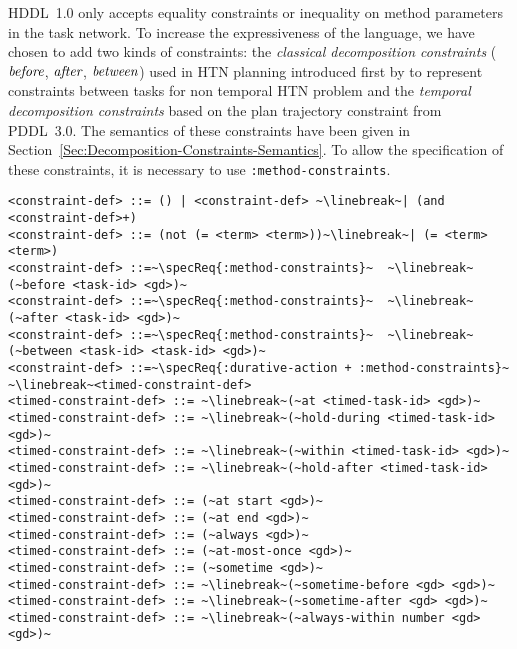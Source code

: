\documentclass[letterpaper]{article} %
\newcommand{\before}{\text{\it before}}
\newcommand{\after}{\text{\it after}}
\renewcommand{\between}{\text{\it between}}
\begin{document}
%
%
HDDL~1.0 only accepts equality constraints or inequality on method parameters in the task network. To increase the expressiveness of the language, we have chosen to add two kinds of constraints: the {\em classical decomposition constraints} ($\before$, $\after$, $\between$) used in HTN planning introduced first by \citep{erol94} to represent constraints between tasks for non temporal HTN problem and the {\em temporal decomposition constraints} based on the plan trajectory constraint from PDDL~3.0. The semantics of these constraints have been given in Section~\ref{Sec:Decomposition-Constraints-Semantics}. To allow the specification of these constraints, it is necessary to use \verb+:method-constraints+.

\begin{lstlisting}[firstnumber=last, basicstyle=\fontsize{8.5}{10}\selectfont\ttfamily, escapechar=~]
<constraint-def> ::= () | <constraint-def> ~\linebreak~| (and <constraint-def>+)
<constraint-def> ::= (not (= <term> <term>))~\linebreak~| (= <term> <term>)
<constraint-def> ::=~\specReq{:method-constraints}~  ~\linebreak~(~before <task-id> <gd>)~
<constraint-def> ::=~\specReq{:method-constraints}~  ~\linebreak~(~after <task-id> <gd>)~
<constraint-def> ::=~\specReq{:method-constraints}~  ~\linebreak~(~between <task-id> <task-id> <gd>)~
<constraint-def> ::=~\specReq{:durative-action + :method-constraints}~ ~\linebreak~<timed-constraint-def>
<timed-constraint-def> ::= ~\linebreak~(~at <timed-task-id> <gd>)~
<timed-constraint-def> ::= ~\linebreak~(~hold-during <timed-task-id> <gd>)~
<timed-constraint-def> ::= ~\linebreak~(~within <timed-task-id> <gd>)~
<timed-constraint-def> ::= ~\linebreak~(~hold-after <timed-task-id> <gd>)~
<timed-constraint-def> ::= (~at start <gd>)~
<timed-constraint-def> ::= (~at end <gd>)~
<timed-constraint-def> ::= (~always <gd>)~
<timed-constraint-def> ::= (~at-most-once <gd>)~
<timed-constraint-def> ::= (~sometime <gd>)~
<timed-constraint-def> ::= ~\linebreak~(~sometime-before <gd> <gd>)~
<timed-constraint-def> ::= ~\linebreak~(~sometime-after <gd> <gd>)~
<timed-constraint-def> ::= ~\linebreak~(~always-within number <gd> <gd>)~
\end{lstlisting}
\end{document}
